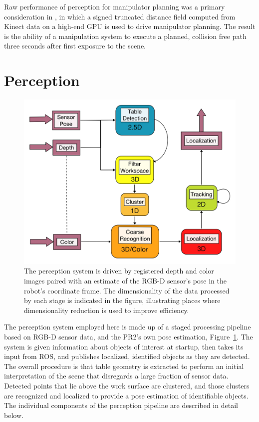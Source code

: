 \documentclass[letterpaper, 10 pt, conference]{ieeeconf}  %
\begin{document}
Raw performance of perception for manipulator planning was a primary
consideration in \cite{Wagner2013:GPUMotionPlanning}, in which a
signed truncated distance field computed from Kinect data on a
high-end GPU is used to drive manipulator planning. The result is the
ability of a manipulation system to execute a planned, collision free
path three seconds after first exposure to the scene.

\section{Perception}
\begin{figure}[t]
\centering
\includegraphics[width=0.9\columnwidth]{figures/perception-pipeline.jpg}
\caption{ The perception system is driven by registered depth and
  color images paired with an estimate of the RGB-D sensor's pose in
  the robot's coordinate frame. The dimensionality of the data
  processed by each stage is indicated in the figure, illustrating
  places where dimensionality reduction is used to improve efficiency.
}
\label{fig:perception-pipeline}
\end{figure}

The perception system employed here is made up of a staged processing
pipeline based on RGB-D sensor data, and the PR2's own pose
estimation, Figure~\ref{fig:perception-pipeline}. The system is given
information about objects of interest at startup, then takes its input
from ROS, and publishes localized, identified objects as they are
detected. The overall procedure is that table geometry is extracted to
perform an initial interpretation of the scene that disregards a large
fraction of sensor data. Detected points that lie above the work
surface are clustered, and those clusters are recognized and localized
to provide a pose estimation of identifiable objects. The individual
components of the perception pipeline are described in detail below.
\end{document}
